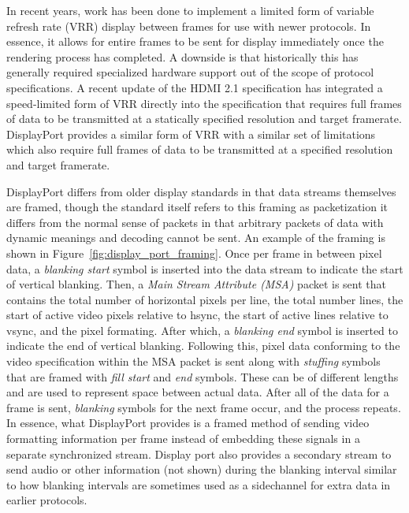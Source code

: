     In recent years, work has been done to implement a limited form of variable refresh rate (VRR) display between frames for use with newer protocols\cite{AMD2019,NVIDIA2020_1}. In essence, it allows for entire frames to be sent for display immediately once the rendering process has completed. A downside is that historically this has generally required specialized hardware support out of the scope of protocol specifications. A recent update of the HDMI 2.1 specification\cite{HDMIForum2018} has integrated a speed-limited form of VRR directly into the specification that requires full frames of data to be transmitted at a statically specified resolution and target framerate. DisplayPort provides a similar form of VRR\cite{VESA2014} with a similar set of limitations which also require full frames of data to be transmitted at a specified resolution and target framerate.

    DisplayPort differs from older display standards in that data streams themselves are framed\cite{VESA2011,Wiley2011}, though the standard itself refers to this framing as packetization it differs from the normal sense of packets in that arbitrary packets of data with dynamic meanings and decoding cannot be sent. An example of the framing is shown in Figure~\ref{fig:display_port_framing}. Once per frame in between pixel data, a {\it blanking start} symbol is inserted into the data stream to indicate the start of vertical blanking. Then, a {\it Main Stream Attribute (MSA)} packet is sent that contains the total number of horizontal pixels per line, the total number lines, the start of active video pixels relative to hsync, the start of active lines relative to vsync, and the pixel formating. After which, a {\it blanking end} symbol is inserted to indicate the end of vertical blanking. Following this, pixel data conforming to the video specification within the MSA packet is sent along with {\it stuffing} symbols that are framed with {\it fill start} and {\it end} symbols. These can be of different lengths and are used to represent space between actual data. After all of the data for a frame is sent, {\it blanking} symbols for the next frame occur, and the process repeats. In essence, what DisplayPort provides is a framed method of sending video formatting information per frame instead of embedding these signals in a separate synchronized stream. Display port also provides a secondary stream to send audio or other information (not shown) during the blanking interval similar to how blanking intervals are sometimes used as a sidechannel for extra data in earlier protocols.

